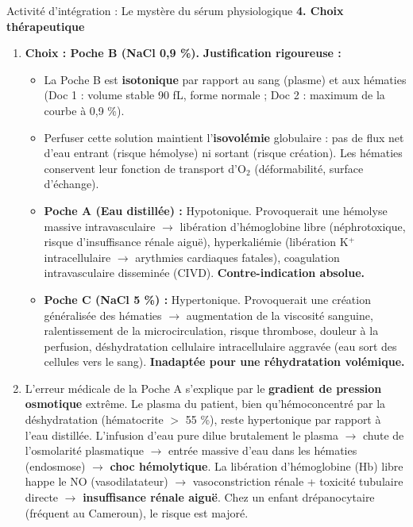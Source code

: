 \documentclass[11pt]{article}
\begin{document}
\begin{exoresolu}{Activité d'intégration : Le mystère du sérum physiologique}
\medskip
\noindent\textbf{4. Choix thérapeutique}
\begin{enumerate}
    \item \textbf{Choix : Poche B (NaCl 0,9 \%).}
    \textbf{Justification rigoureuse :}
    \begin{itemize}
        \item La Poche B est \textbf{isotonique} par rapport au sang (plasme) et aux hématies (Doc 1 : volume stable 90 fL, forme normale ; Doc 2 : maximum de la courbe à 0,9 \%).
        \item Perfuser cette solution maintient l'\textbf{isovolémie} globulaire : pas de flux net d'eau entrant (risque hémolyse) ni sortant (risque création). Les hématies conservent leur fonction de transport d'O$_2$ (déformabilité, surface d'échange).
        \item \textbf{Poche A (Eau distillée) :} Hypotonique. Provoquerait une hémolyse massive intravasculaire $\rightarrow$ libération d'hémoglobine libre (néphrotoxique, risque d'insuffisance rénale aiguë), hyperkaliémie (libération K$^+$ intracellulaire $\rightarrow$ arythmies cardiaques fatales), coagulation intravasculaire disseminée (CIVD). \textbf{Contre-indication absolue.}
        \item \textbf{Poche C (NaCl 5 \%) :} Hypertonique. Provoquerait une création généralisée des hématies $\rightarrow$ augmentation de la viscosité sanguine, ralentissement de la microcirculation, risque thrombose, douleur à la perfusion, déshydratation cellulaire intracellulaire aggravée (eau sort des cellules vers le sang). \textbf{Inadaptée pour une réhydratation volémique.}
    \end{itemize}
    \item L'erreur médicale de la Poche A s'explique par le \textbf{gradient de pression osmotique} extrême. Le plasma du patient, bien qu'hémoconcentré par la déshydratation (hématocrite $>$ 55 \%), reste hypertonique par rapport à l'eau distillée. L'infusion d'eau pure dilue brutalement le plasma $\rightarrow$ chute de l'osmolarité plasmatique $\rightarrow$ entrée massive d'eau dans les hématies (endosmose) $\rightarrow$ \textbf{choc hémolytique}. La libération d'hémoglobine (Hb) libre happe le NO (vasodilatateur) $\rightarrow$ vasoconstriction rénale + toxicité tubulaire directe $\rightarrow$ \textbf{insuffisance rénale aiguë}. Chez un enfant drépanocytaire (fréquent au Cameroun), le risque est majoré.
\end{enumerate}


\end{exoresolu}
\end{document}
